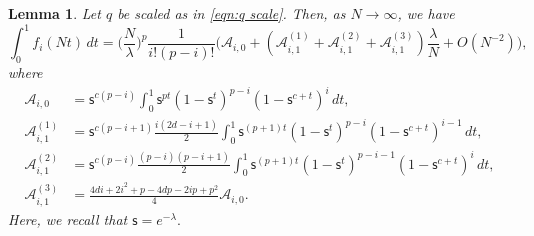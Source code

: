 \documentclass{amsart}
\theoremstyle{plain}
\newtheorem{lem}[thm]{Lemma}
\theoremstyle{remark}
\numberwithin{equation}{section}
\begin{document}
\begin{lem}
    Let $q$ be scaled as in \eqref{eqn:q scale}. Then, as $N\rightarrow\infty$, we have
    \begin{equation}\label{eqn:intf(Nt) asymptotic}
        \int_{0}^{1}f_{i}(Nt)\,dt
        =\Big(\frac{N}{\lambda}\Big)^{p}\frac{1}{i!(p-i)!}\Big(\mathcal{A}_{i,0}+(\mathcal{A}_{i,1}^{(1)}+\mathcal{A}_{i,1}^{(2)}+\mathcal{A}_{i,1}^{(3)})\frac{\lambda}{N}+O(N^{-2})\Big), 
    \end{equation}
    where
        \begin{align} \label{def of mathcal Ai0}
        \mathcal{A}_{i,0}
        &=\mathsf{s}^{c(p-i)} \int_{0}^{1} \mathsf{s}^{pt}(1-\mathsf{s}^{t})^{p-i}(1-\mathsf{s}^{c+t})^{i}\,dt, 
        \\
        \mathcal{A}_{i,1}^{(1)} &=\mathsf{s}^{c(p-i+1)}\frac{i(2d-i+1)}{2}\int_{0}^{1}\mathsf{s}^{(p+1)t}(1-\mathsf{s}^{t})^{p-i}(1-\mathsf{s}^{c+t})^{i-1}\,dt,
        \\
        \mathcal{A}_{i,1}^{(2)} &=\mathsf{s}^{c(p-i)} \frac{(p-i)(p-i+1)}{2}\int_{0}^{1} \mathsf{s}^{(p+1)t}(1-\mathsf{s}^{t})^{p-i-1}(1-\mathsf{s}^{c+t})^{i}\,dt, 
        \\
        \mathcal{A}_{i,1}^{(3)} &=\frac{4di+2i^{2}+p-4dp-2ip+p^2}{4}\mathcal{A}_{i,0}. 
    \end{align}
Here, we recall that $\mathsf{s}=e^{-\lambda}.$   
\end{lem}
\end{document}
